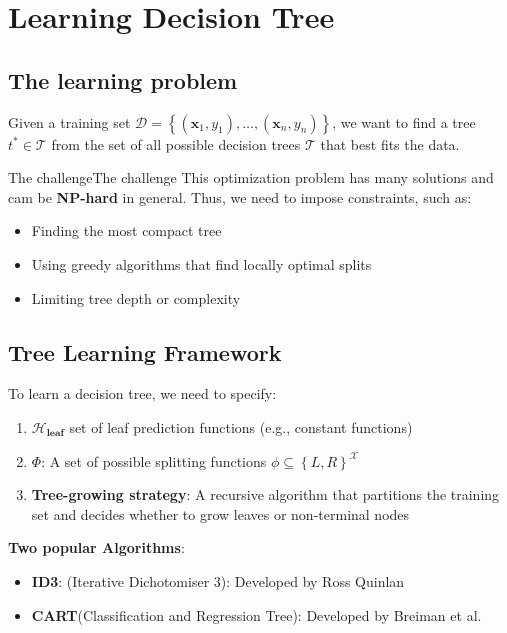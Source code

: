 \documentclass[a4paper]{article}
\theoremstyle{definition}
\begin{document}
\section{Learning Decision Tree}
\subsection{The learning problem}
Given a training set \( \mathcal{D} = \left\{(\mathbf{x}_1,y_1),\ldots,(\mathbf{x}_n,y_n)\right\} \), we want to find a 
tree \( t^* \in \mathcal{T} \) from the set of all possible decision trees \( \mathcal{T} \) that best fits the data.
\begin{theorem}{The challenge}{The challenge}
This optimization problem has many solutions and cam be \textbf{NP-hard} in general. Thus, we need to impose constraints, such as:
\begin{itemize}
    \item Finding the most compact tree 
    \item Using greedy algorithms that find locally optimal splits 
    \item Limiting tree depth or complexity
\end{itemize}
\end{theorem}
\subsection{Tree Learning Framework}
To learn a decision tree, we need to specify:
\begin{enumerate}
    \item \( \mathcal{H}_{\textbf{leaf}} \) set of leaf prediction functions (e.g., constant functions)
    \item \( \Phi \): A set of possible splitting functions \( \phi \subseteq \left\{L,R\right\}^{\mathcal{X}} \)    
    \item \textbf{Tree-growing strategy}: A recursive algorithm that partitions the training set and decides whether to grow leaves or non-terminal nodes
\end{enumerate}
\textbf{Two popular Algorithms}:
\begin{itemize}
    \item \textbf{ID3}: (Iterative Dichotomiser 3): Developed by Ross Quinlan
    \item \textbf{CART}(Classification and Regression Tree): Developed by Breiman et al.
\end{itemize}
\end{document}
